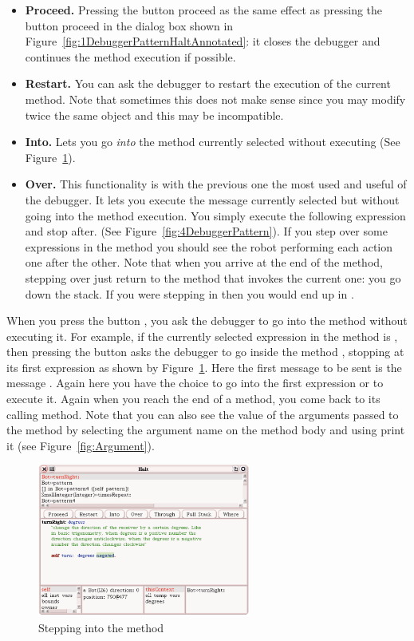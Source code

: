 \begin{itemize}
\item \textbf{Proceed.} Pressing the button proceed as the same effect as pressing the button proceed in the dialog box shown in Figure~\ref{fig:1DebuggerPatternHaltAnnotated}: it closes the debugger and continues the method execution if possible.

\item \textbf{Restart.} You can ask the debugger to restart the execution of the current method. Note that sometimes this does not make sense since you may modify twice the same object and this may be incompatible. 

\item \textbf{Into.} Lets you go \emph{into}  the method currently selected without executing (See Figure~\ref{fig:5DebuggerPattern}). 

\item \textbf{Over.} This functionality is with the previous one the most used and useful of the debugger. It lets you execute the message currently selected but without going into the method execution. You simply execute the following expression and stop after. (See Figure~\ref{fig:4DebuggerPattern}). If you step over some expressions in the method  you should see the robot performing each action one after the other.
Note that when you arrive at the end of the method, stepping over just return to the method that invokes the current one: you go down the stack. If you were stepping in  then you would end up in . 
\end{itemize}



When you press the button , you ask the debugger to go into the method without executing it. For example, if the currently selected expression in the method  is , then pressing the button  asks the debugger to go inside the method , stopping at its first expression as shown by Figure~\ref{fig:5DebuggerPattern}. Here the first message to be sent is the message . Again here you have the choice to go into the first expression or to execute it. Again when you reach the end of  a method, you come back to its calling method. Note that you can also see the value of the arguments passed to the method  by selecting the argument name on the method body and using print it (see Figure~\ref{fig:Argument}). 

\begin{figure}[h]
\centerline{\includegraphics[width=7cm]{6DebuggerSteppingInto}}
\caption{Stepping into the method  \label{fig:5DebuggerPattern}}
\end{figure}

